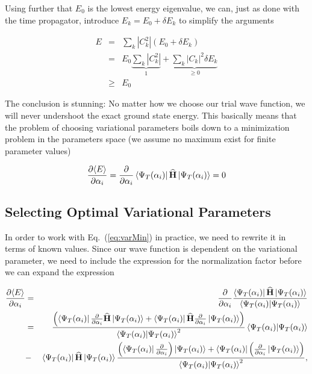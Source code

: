 Using further that $E_0$ is the lowest energy eigenvalue, we can, just as done with the time propagator, introduce $E_k = E_0 + \delta E_k$ to simplify the arguments

\begin{eqnarray*}
 E   &=& \sum_k |C_k^2| (E_0 + \delta E_k) \\
     &=& E_0 \underbrace{\sum_k |C_k^2|}_{1} + \underbrace{\sum_k |C_k|^2\delta E_k}_{\ge 0} \\
     &\ge& E_0
\end{eqnarray*}

The conclusion is stunning: No matter how we choose our trial wave function, we will never undershoot the exact ground state energy. This basically means that the problem of choosing variational parameters boils down to a minimization problem in the parameters space (we assume no maximum exist for finite parameter values)

\begin{equation}
\label{eq:varMin}
\frac{\partial \langle E\rangle}{\partial \alpha_i} = \frac{\partial}{\partial \alpha_i}\left< \Psi_T(\alpha_i) \right|{\bf\widehat{H}}\left| \Psi_T(\alpha_i) \right> = 0
\end{equation}

\subsection{Selecting Optimal Variational Parameters}
\label{sec:selectingOptVarPar}

In order to work with Eq.~(\ref{eq:varMin}) in practice, we need to rewrite it in terms of known values. Since our wave function is dependent on the variational parameter, we need to include the expression for the normalization factor before we can expand the expression

\newcommand{\Norm}{\braket{\Psi_T(\alpha_i)}{\Psi_T(\alpha_i)}}

\begin{eqnarray*}
 \frac{\partial \langle E\rangle}{\partial \alpha_i}  &=& \frac{\partial}{\partial \alpha_i} \frac{\bra{\Psi_T(\alpha_i)}\OP{H}\ket{\Psi_T(\alpha_i)}}{\Norm} \\
 &=& \frac{\left(\bra{\Psi_T(\alpha_i)}\frac{\partial}{\partial \alpha_i}\OP{H}\ket{\Psi_T(\alpha_i)} + \bra{\Psi_T(\alpha_i)}\OP{H}\frac{\partial}{\partial \alpha_i}\ket{\Psi_T(\alpha_i)}\right)}{\Norm^2}\Norm \\
 &-& \bra{\Psi_T(\alpha_i)}\OP{H}\ket{\Psi_T(\alpha_i)}\frac{\left(\bra{\Psi_T(\alpha_i)}\frac{\partial}{\partial \alpha_i}\right)\ket{\Psi_T(\alpha_i)} + \bra{\Psi_T(\alpha_i)}\left(\frac{\partial}{\partial \alpha_i}\ket{\Psi_T(\alpha_i)}\right)}{\Norm^2},\\
\end{eqnarray*}

